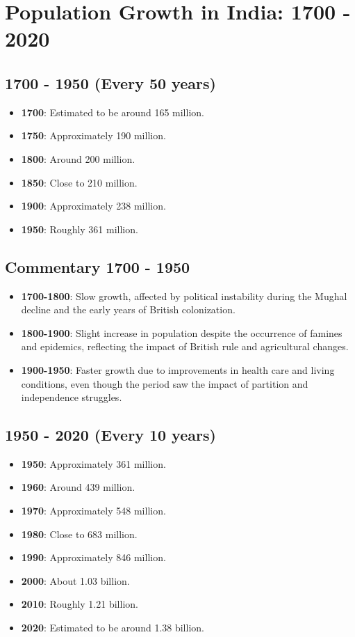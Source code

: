 \section{Population Growth in India: 1700 - 2020}

\subsection*{1700 - 1950 (Every 50 years)}
\begin{itemize}
    \item \textbf{1700}: Estimated to be around 165 million.
    \item \textbf{1750}: Approximately 190 million.
    \item \textbf{1800}: Around 200 million.
    \item \textbf{1850}: Close to 210 million.
    \item \textbf{1900}: Approximately 238 million.
    \item \textbf{1950}: Roughly 361 million.
\end{itemize}

\subsection*{Commentary 1700 - 1950}
\begin{itemize}
    \item \textbf{1700-1800}: Slow growth, affected by political instability during the Mughal decline and the early years of British colonization.
    \item \textbf{1800-1900}: Slight increase in population despite the occurrence of famines and epidemics, reflecting the impact of British rule and agricultural changes.
    \item \textbf{1900-1950}: Faster growth due to improvements in health care and living conditions, even though the period saw the impact of partition and independence struggles.
\end{itemize}

\subsection*{1950 - 2020 (Every 10 years)}
\begin{itemize}
    \item \textbf{1950}: Approximately 361 million.
    \item \textbf{1960}: Around 439 million.
    \item \textbf{1970}: Approximately 548 million.
    \item \textbf{1980}: Close to 683 million.
    \item \textbf{1990}: Approximately 846 million.
    \item \textbf{2000}: About 1.03 billion.
    \item \textbf{2010}: Roughly 1.21 billion.
    \item \textbf{2020}: Estimated to be around 1.38 billion.
\end{itemize}

